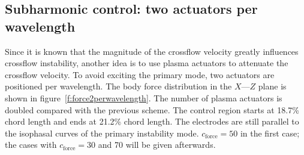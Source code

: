 \subsection{Subharmonic control: two actuators per wavelength}\label{subs:control2}
Since it is known that the magnitude of the crossflow velocity greatly influences  crossflow instability, another idea is to use plasma actuators to attenuate the crossflow velocity. To avoid exciting the primary mode, two actuators are positioned per wavelength. The body force distribution in the $X$---$Z$ plane is shown in figure~\ref{f:force2perwavelength}. The number of plasma actuators is doubled compared with the previous scheme. The control region starts at 18.7\% chord length and ends at 21.2\% chord length. The electrodes are still parallel to the isophasal curves of the primary instability mode. $c_\mathrm{force}=50$ in the first case; the cases with  $c_\mathrm{force}=30$ and 70 will be given afterwards.

